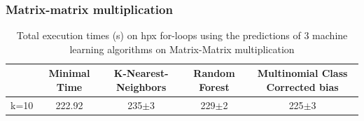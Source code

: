 \newpage
\subsubsection{Matrix-matrix multiplication}
\begin{table}[h]
	\centering
	\caption{Total execution times (s) on hpx for-loops using the predictions of 3 machine learning algorithms on Matrix-Matrix multiplication}
	\label{my-label}
	\begin{tabular}{|c|c|c|c|c|}
		\hline
		& Minimal Time&K-Nearest-Neighbors & Random Forest &Multinomial Class Corrected bias\\ \hline
		k=10  &222.92&
		235$\pm$3       & 229$\pm$2&225$\pm$3 \\ \hline
	\end{tabular}
\end{table}


